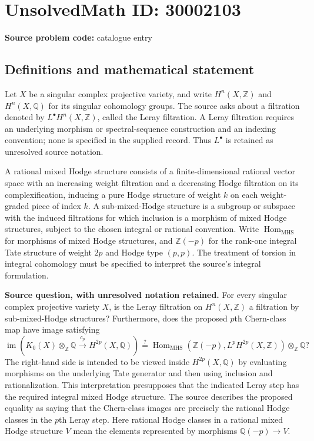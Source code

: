\documentclass[11pt]{article}
\newcommand{\Z}{\mathbb{Z}}
\newcommand{\Q}{\mathbb{Q}}
\begin{document}
\section*{UnsolvedMath ID: 30002103}
\textbf{Source problem code:} catalogue entry
\subsection{Definitions and mathematical statement}
Let \(X\) be a singular complex projective variety, and write \(H^n(X,\Z)\) and \(H^n(X,\Q)\) for its singular cohomology groups. The source asks about a filtration denoted by \(L^\bullet H^n(X,\Z)\), called the Leray filtration. A Leray filtration requires an underlying morphism or spectral-sequence construction and an indexing convention; none is specified in the supplied record. Thus \(L^\bullet\) is retained as unresolved source notation.

A rational mixed Hodge structure consists of a finite-dimensional rational vector space with an increasing weight filtration and a decreasing Hodge filtration on its complexification, inducing a pure Hodge structure of weight \(k\) on each weight-graded piece of index \(k\). A sub-mixed-Hodge structure is a subgroup or subspace with the induced filtrations for which inclusion is a morphism of mixed Hodge structures, subject to the chosen integral or rational convention. Write \(\operatorname{Hom}_{\mathrm{MHS}}\) for morphisms of mixed Hodge structures, and \(\Z(-p)\) for the rank-one integral Tate structure of weight \(2p\) and Hodge type \((p,p)\). The treatment of torsion in integral cohomology must be specified to interpret the source's integral formulation.

\textbf{Source question, with unresolved notation retained.} For every singular complex projective variety \(X\), is the Leray filtration on \(H^n(X,\Z)\) a filtration by sub-mixed-Hodge structures? Furthermore, does the proposed \(p\)th Chern-class map have image satisfying
\[
\operatorname{im}\!\left(
K_0(X)\otimes_{\Z}\Q
\xrightarrow{\ c_p\ }
H^{2p}(X,\Q)
\right)
\stackrel{?}{=}
\operatorname{Hom}_{\mathrm{MHS}}\!\left(
\Z(-p),L^pH^{2p}(X,\Z)
\right)\otimes_{\Z}\Q?
\]
The right-hand side is intended to be viewed inside \(H^{2p}(X,\Q)\) by evaluating morphisms on the underlying Tate generator and then using inclusion and rationalization. This interpretation presupposes that the indicated Leray step has the required integral mixed Hodge structure. The source describes the proposed equality as saying that the Chern-class images are precisely the rational Hodge classes in the \(p\)th Leray step. Here rational Hodge classes in a rational mixed Hodge structure \(V\) mean the elements represented by morphisms \(\Q(-p)\to V\).
\end{document}
